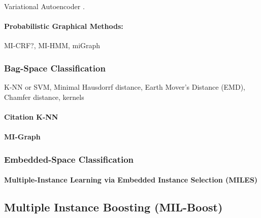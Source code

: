 Variational Autoencoder \citep{Ghaffarzadegan2018MILVAE}.

\paragraph{Probabilistic Graphical Methods:}
MI-CRF?, MI-HMM, miGraph

\subsubsection{Bag-Space Classification}


K-NN or SVM, Minimal Hausdorrf distance, Earth Mover's Distance (EMD), Chamfer distance, kernels

\paragraph{Citation K-NN}

\paragraph{MI-Graph}


\subsubsection{Embedded-Space Classification}

\paragraph{Multiple-Instance Learning via Embedded Instance Selection (MILES)}

\cite{Chen2006MILES,RuizMunoz2015MILBirdsongClassification}


\subsection{Multiple Instance Boosting (MIL-Boost)}

